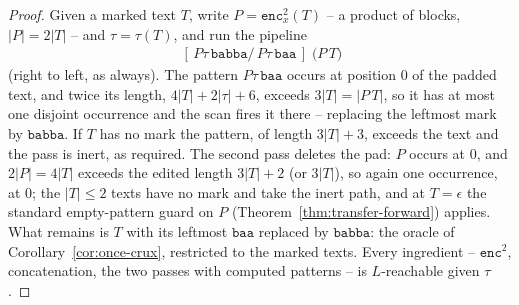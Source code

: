 \documentclass[runningheads,envcountsect]{llncs}
\begin{document}
\begin{proof}
    Given a marked text $T$, write $P = \mathtt{enc}^2_{x}(T)$ -- a product of blocks, $|P| = 2|T|$ -- and $\tau = \tau(T)$, and run the pipeline
    \begin{align}
        [\,\epsilon/P\,]\;[\,P\tau\,\mathtt{babba}/\,P\tau\,\mathtt{baa}\,]\;\big(P\,T\big)
    \end{align}
    (right to left, as always). The pattern $P\tau\,\mathtt{baa}$ occurs at position $0$ of the padded text, and twice its length, $4|T| + 2|\tau| + 6$, exceeds $3|T| = |P\,T|$, so it has at most one disjoint occurrence and the scan fires it there -- replacing the leftmost mark by $\mathtt{babba}$. If $T$ has no mark the pattern, of length $3|T|+3$, exceeds the text and the pass is inert, as required. The second pass deletes the pad: $P$ occurs at $0$, and $2|P| = 4|T|$ exceeds the edited length $3|T|+2$ (or $3|T|$), so again one occurrence, at $0$; the $|T| \leq 2$ texts have no mark and take the inert path, and at $T = \epsilon$ the standard empty-pattern guard on $P$ (Theorem~\ref{thm:transfer-forward}) applies. What remains is $T$ with its leftmost $\mathtt{baa}$ replaced by $\mathtt{babba}$: the oracle of Corollary~\ref{cor:once-crux}, restricted to the marked texts. Every ingredient -- $\mathtt{enc}^2$, concatenation, the two passes with computed patterns -- is $L$-reachable given $\tau$.
\end{proof}
\end{document}
